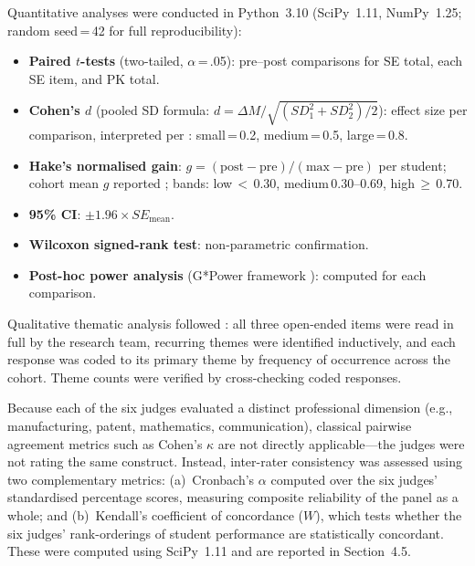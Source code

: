 \documentclass[utf8]{FrontiersinHarvard}
\begin{document}
Quantitative analyses were conducted in Python~3.10 (SciPy~1.11,
NumPy~1.25; random seed\,=\,42 for full reproducibility):

\begin{itemize}\setlength{\itemsep}{0pt}\setlength{\parskip}{0pt}
  \item \textbf{Paired $t$-tests} (two-tailed, $\alpha$\,=\,.05): pre--post
    comparisons for SE total, each SE item, and PK total.

  \item \textbf{Cohen's $d$} (pooled SD formula:
    $d = \Delta M / \sqrt{(SD_1^2 + SD_2^2)/2}$): effect size per comparison,
    interpreted per \citet{cohen1988statistical}: small\,=\,0.2,
    medium\,=\,0.5, large\,=\,0.8.

  \item \textbf{Hake's normalised gain}:
    $g = (\text{post} - \text{pre}) / (\text{max} - \text{pre})$ per
    student; cohort mean $g$ reported \citep{hake1998interactive};
    bands: low\,$<$\,0.30, medium\,0.30--0.69, high\,$\geq$\,0.70.

  \item \textbf{95\% CI}: $\pm 1.96 \times SE_{\text{mean}}$.

  \item \textbf{Wilcoxon signed-rank test}: non-parametric confirmation.

  \item \textbf{Post-hoc power analysis} (G*Power framework
    \citep{faul2007gpower}): computed for each comparison.
\end{itemize}

Qualitative thematic analysis followed \citet{thomas2008methods}: all three
open-ended items were read in full by the research team, recurring themes were
identified inductively, and each response was coded to its primary theme by
frequency of occurrence across the cohort. Theme counts were verified by
cross-checking coded responses.

{\color{blue} Because each of the six judges evaluated a distinct professional dimension
(e.g., manufacturing, patent, mathematics, communication), classical pairwise
agreement metrics such as Cohen's $\kappa$ are not directly applicable---the
judges were not rating the same construct. Instead, inter-rater consistency
was assessed using two complementary metrics: (a)~Cronbach's $\alpha$
computed over the six judges' standardised percentage scores, measuring
composite reliability of the panel as a whole; and (b)~Kendall's coefficient
of concordance ($W$), which tests whether the six judges' rank-orderings of
student performance are statistically concordant. These were computed using
SciPy~1.11 and are reported in Section~4.5.}
\end{document}
